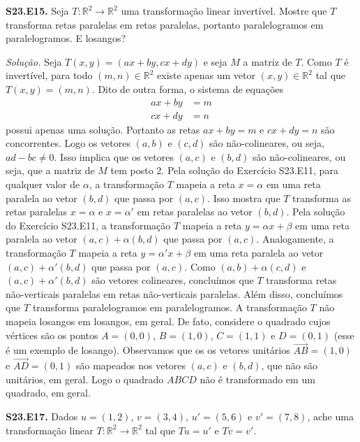 \documentclass[a4paper,11pt]{article}
\newcommand{\R}{\mathbb{R}}
\begin{document}
\vspace{\baselineskip}

\textbf{S23.E15.}
Seja $T : \R^2 \to \R^2$ uma transformação linear invertível.
Mostre que $T$ transforma retas paralelas em retas paralelas, portanto paralelogramos em paralelogramos.
E losangos?

\vspace{\baselineskip}

\emph{Solução.}
Seja $T(x,y) = (ax + by, cx + dy)$ e seja $M$ a matriz de $T$.
Como $T$ é invertível, para todo $(m,n) \in \R^2$ existe apenas um vetor $(x,y) \in \R^2$ tal que $T(x,y) = (m,n)$.
Dito de outra forma, o sistema de equações
\begin{align*}
  ax + by & = m \\
  cx + dy & = n
\end{align*}
possui apenas uma solução.
Portanto as retas $ax + by = m$ e $cx + dy = n$ são concorrentes.
Logo os vetores $(a,b)$ e $(c,d)$ são não-colineares, ou seja, $ad - bc \neq 0$.
Isso implica que os vetores $(a,c)$ e $(b,d)$ são não-colineares, ou seja, que a matriz de $M$ tem posto 2.
Pela solução do Exercício S23.E11, para qualquer valor de $\alpha$, a transformação $T$ mapeia a reta $x = \alpha$ em uma reta paralela ao vetor $(b,d)$ que passa por $(a,c)$.
Isso mostra que $T$ transforma as retas paralelas $x = \alpha$ e $x = \alpha'$ em retas paralelas ao vetor $(b,d)$.
Pela solução do Exercício S23.E11, a transformação $T$ mapeia a reta $y = \alpha x + \beta$ em uma reta paralela ao vetor $(a,c) + \alpha(b,d)$ que passa por $(a,c)$.
Analogamente, a transformação $T$ mapeia a reta $y = \alpha' x + \beta$ em uma reta paralela ao vetor $(a,c) + \alpha'(b,d)$ que passa por $(a,c)$.
Como $(a,b) + \alpha(c,d)$ e $(a,c) + \alpha'(b,d)$ são vetores colineares, concluímos que $T$ transforma retas não-verticais paralelas em retas não-verticais paralelas.
Além disso, concluímos que $T$ transforma paralelogramos em paralelogramos.
A transformação $T$ não mapeia losangos em losangos, em geral.
De fato, considere o quadrado cujos vértices são os pontos $A = (0,0)$, $B = (1,0)$, $C = (1,1)$ e $D = (0,1)$ (esse é um exemplo de losango).
Observamos que os os vetores unitários $\overrightarrow{AB} = (1,0)$ e $\overrightarrow{AD} = (0,1)$ são mapeados nos vetores $(a,c)$ e $(b,d)$, que não são unitários, em geral.
Logo o quadrado $ABCD$ não é transformado em um quadrado, em geral.

\vspace{\baselineskip}

\textbf{S23.E17.}
Dados $u = (1,2)$, $v = (3,4)$, $u' = (5,6)$ e $v' = (7,8)$, ache uma transformação linear $T : \mathbb{R}^2 \to \mathbb{R}^2$ tal que $Tu = u'$ e $Tv = v'$.
\end{document}
